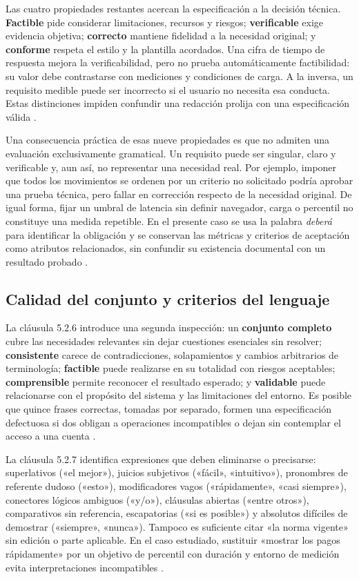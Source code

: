 \documentclass[10pt,a4paper]{extarticle}
\begin{document}
Las cuatro propiedades restantes acercan la especificación a la decisión técnica. \textbf{Factible} pide considerar limitaciones, recursos y riesgos; \textbf{verificable} exige evidencia objetiva; \textbf{correcto} mantiene fidelidad a la necesidad original; y \textbf{conforme} respeta el estilo y la plantilla acordados. Una cifra de tiempo de respuesta mejora la verificabilidad, pero no prueba automáticamente factibilidad: su valor debe contrastarse con mediciones y condiciones de carga. A la inversa, un requisito medible puede ser incorrecto si el usuario no necesita esa conducta. Estas distinciones impiden confundir una redacción prolija con una especificación válida \cite[cláusula 5.2.5]{iso29148}.

Una consecuencia práctica de esas nueve propiedades es que no admiten una evaluación exclusivamente gramatical. Un requisito puede ser singular, claro y verificable y, aun así, no representar una necesidad real. Por ejemplo, imponer que todos los movimientos se ordenen por un criterio no solicitado podría aprobar una prueba técnica, pero fallar en corrección respecto de la necesidad original. De igual forma, fijar un umbral de latencia sin definir navegador, carga o percentil no constituye una medida repetible. En el presente caso se usa la palabra \emph{deberá} para identificar la obligación y se conservan las métricas y criterios de aceptación como atributos relacionados, sin confundir su existencia documental con un resultado probado \cite[cláusula 5.2.5]{iso29148}.

\subsection{Calidad del conjunto y criterios del lenguaje}
La cláusula 5.2.6 introduce una segunda inspección: un \textbf{conjunto completo} cubre las necesidades relevantes sin dejar cuestiones esenciales sin resolver; \textbf{consistente} carece de contradicciones, solapamientos y cambios arbitrarios de terminología; \textbf{factible} puede realizarse en su totalidad con riesgos aceptables; \textbf{comprensible} permite reconocer el resultado esperado; y \textbf{validable} puede relacionarse con el propósito del sistema y las limitaciones del entorno. Es posible que quince frases correctas, tomadas por separado, formen una especificación defectuosa si dos obligan a operaciones incompatibles o dejan sin contemplar el acceso a una cuenta \cite[cláusula 5.2.6]{iso29148}.

La cláusula 5.2.7 identifica expresiones que deben eliminarse o precisarse: superlativos («el mejor»), juicios subjetivos («fácil», «intuitivo»), pronombres de referente dudoso («esto»), modificadores vagos («rápidamente», «casi siempre»), conectores lógicos ambiguos («y/o»), cláusulas abiertas («entre otros»), comparativos sin referencia, escapatorias («si es posible») y absolutos difíciles de demostrar («siempre», «nunca»). Tampoco es suficiente citar «la norma vigente» sin edición o parte aplicable. En el caso estudiado, sustituir «mostrar los pagos rápidamente» por un objetivo de percentil con duración y entorno de medición evita interpretaciones incompatibles \cite[cláusula 5.2.7]{iso29148}.
\end{document}
